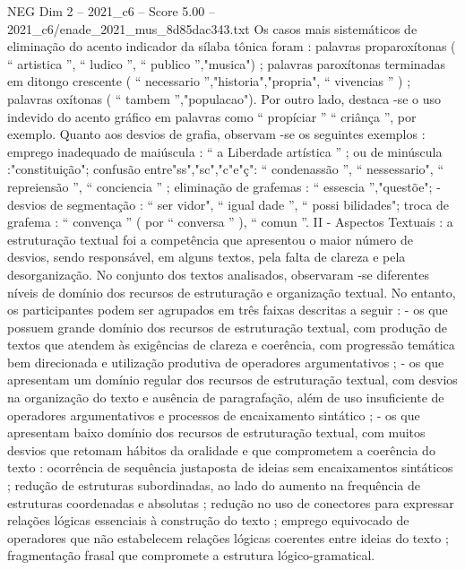 \begin{textsample}{NEG Dim 2 – 2021\_c6 – Score 5.00 – 2021\_c6/enade\_2021\_mus\_8d85dac343.txt}
Os casos mais sistemáticos de eliminação do acento indicador da sílaba tônica foram : palavras proparoxítonas ( “ artistica ”, “ ludico ”, “ publico ”,"musica") ; palavras paroxítonas terminadas em ditongo crescente ( “ necessario ”,"historia","propria", “ vivencias ” ) ; palavras oxítonas ( “ tambem ”,"populacao").
Por outro lado, destaca -se o uso indevido do acento gráfico em palavras como “ propíciar ” “ criânça ”, por exemplo.
Quanto aos desvios de grafia, observam -se os seguintes exemplos : emprego inadequado de maiúscula : “ a Liberdade artística ” ; ou de minúscula :"constituição"; confusão entre"ss","sc","c"e"ç": “ condenassão ”, “ nessessario", “ repreiensão ”, “ conciencia ” ; eliminação de grafemas : “ essescia ”,"questõe"; - desvios de segmentação : “ ser vidor", “ igual dade ”, “ possi bilidades"; troca de grafema : “ convença ” ( por “ conversa ” ), “ comun ”.
II - Aspectos Textuais : a estruturação textual foi a competência que apresentou o maior número de desvios, sendo responsável, em alguns textos, pela falta de clareza e pela desorganização.
No conjunto dos textos analisados, observaram -se diferentes níveis de domínio dos recursos de estruturação e organização textual.
No entanto, os participantes podem ser agrupados em três faixas descritas a seguir : - os que possuem grande domínio dos recursos de estruturação textual, com produção de textos que atendem às exigências de clareza e coerência, com progressão temática bem direcionada e utilização produtiva de operadores argumentativos ; - os que apresentam um domínio regular dos recursos de estruturação textual, com desvios na organização do texto e ausência de paragrafação, além de uso insuficiente de operadores argumentativos e processos de encaixamento sintático ; - os que apresentam baixo domínio dos recursos de estruturação textual, com muitos desvios que retomam hábitos da oralidade e que comprometem a coerência do texto : ocorrência de sequência justaposta de ideias sem encaixamentos sintáticos ; redução de estruturas subordinadas, ao lado do aumento na frequência de estruturas coordenadas e absolutas ; redução no uso de conectores para expressar relações lógicas essenciais à construção do texto ; emprego equivocado de operadores que não estabelecem relações lógicas coerentes entre ideias do texto ; fragmentação frasal que compromete a estrutura lógico-gramatical.

\end{textsample}
